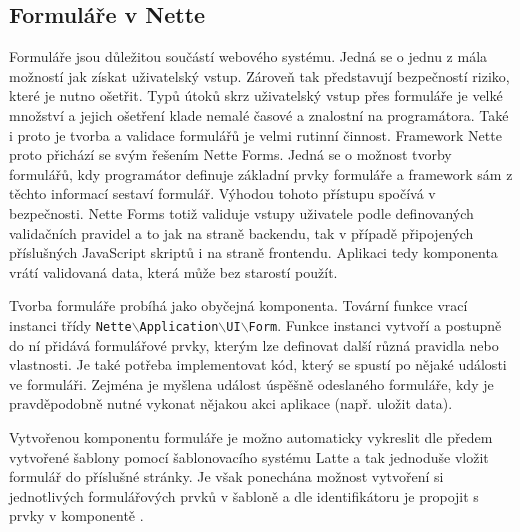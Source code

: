 \documentclass[czech,BP]{thesiskiv}
\begin{document}
		\subsection{Formuláře v Nette}
		\par Formuláře jsou důležitou součástí webového systému. Jedná se o jednu z mála možností jak získat uživatelský vstup. Zároveň tak představují bezpečností riziko, které je nutno ošetřit. Typů útoků skrz uživatelský vstup přes formuláře je velké množství a jejich ošetření klade nemalé časové a znalostní na programátora. Také i proto je tvorba a validace formulářů je velmi rutinní činnost. Framework Nette proto přichází se svým řešením Nette Forms. Jedná se o možnost tvorby formulářů, kdy programátor definuje základní prvky formuláře a framework sám z těchto informací sestaví formulář. Výhodou tohoto přístupu spočívá v bezpečnosti. Nette Forms totiž validuje vstupy uživatele podle definovaných validačních pravidel a to jak na straně backendu, tak v případě připojených příslušných JavaScript skriptů i na straně frontendu. Aplikaci tedy komponenta vrátí validovaná data, která může bez starostí použít.
		\par Tvorba formuláře probíhá jako obyčejná komponenta. Tovární funkce vrací instanci třídy \texttt{Nette$\backslash$Application$\backslash$UI$\backslash$Form}. Funkce instanci vytvoří a postupně do ní přidává formulářové prvky, kterým lze definovat další různá pravidla nebo vlastnosti. Je také potřeba implementovat kód, který se spustí po nějaké události ve formuláři. Zejména je myšlena událost úspěšně odeslaného formuláře, kdy je pravděpodobně nutné vykonat nějakou akci aplikace (např. uložit data).
		\par Vytvořenou komponentu formuláře je možno automaticky vykreslit dle předem vytvořené šablony pomocí šablonovacího systému Latte a tak jednoduše vložit formulář do příslušné stránky. Je však ponechána možnost vytvoření si jednotlivých formulářových prvků v šabloně a dle identifikátoru je propojit s prvky v komponentě \cite{NetteDI}.
		
\end{document}
